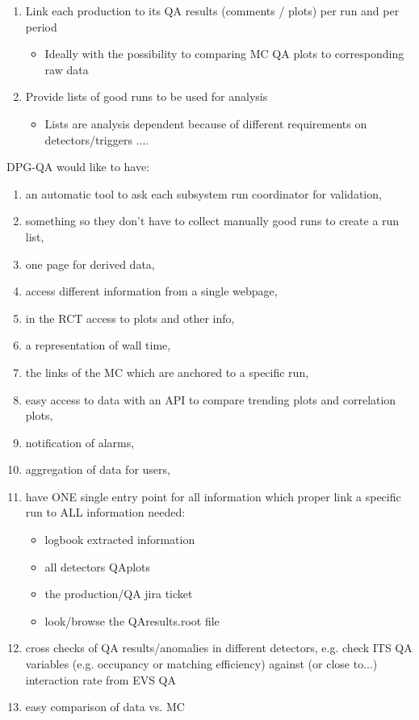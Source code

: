 \begin{enumerate}
  \item Link each production to its QA results (comments / plots) per run and per period
  \begin{itemize}
    \item Ideally with the possibility to comparing MC QA plots to corresponding
raw data
  \end{itemize}
  \item Provide lists of good runs to be used for analysis
  \begin{itemize}
    \item Lists are analysis dependent because of different requirements on
detectors/triggers ....
  \end{itemize}
\end{enumerate}

DPG-QA would like to have:
\begin{enumerate}
  \item an automatic tool to ask each subsystem run coordinator for validation,
  \item something so they don't have to collect manually good runs to create a run list,
  \item one page for derived data,
  \item access different information from a single webpage,
  \item in the RCT access to plots and other info,
  \item a representation of wall time,
  \item the links of the MC which are anchored to a specific run,
  \item easy access to data with an API to compare trending plots and correlation plots,
  \item notification of alarms,
  \item aggregation of data for users,
  \item have ONE single entry point for all information which proper link a specific run to ALL information needed:
  \begin{itemize}
    \item logbook extracted information
    \item all detectors QAplots
    \item the production/QA jira ticket
    \item look/browse the QAresults.root file
  \end{itemize}
  \item cross checks of QA results/anomalies in different detectors, e.g. check ITS QA variables (e.g. occupancy or matching efficiency) against (or close to...) interaction rate from EVS QA
  \item easy comparison of data vs. MC
\end{enumerate}

